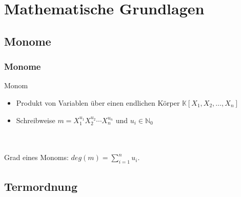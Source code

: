 \documentclass{beamer}
\begin{document}

\section{Mathematische Grundlagen}



\subsection{Monome}

\begin{frame}[fragile]
\frametitle{Monome }

\begin{block}{Monom}
\begin{itemize}
\item Produkt von Variablen über einen endlichen Körper $ \mathbb{K} \left[X_{1},X_{2},\dots, X_{n}\right]  $ 
\item Schreibweise $m= X_{1}^{u_{1}}X_{2}^{u_{2}}\cdots X_{n}^{u_{n}}$ und $u_i \in \mathbb{N}_{0}  $
\end{itemize}

\end{block}
~\\
~\\
Grad eines Monoms:  $deg(m) = \sum_{i=1}^n u_i $. 




\end{frame}

\subsection{Termordnung}
\end{document}
